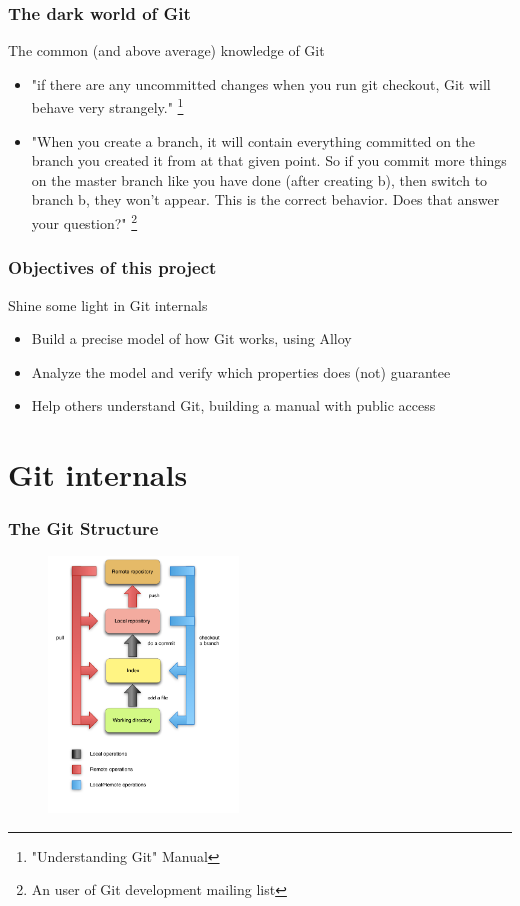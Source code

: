 \documentclass{beamer}
\begin{document}
\begin{frame}
	\frametitle{The dark world of Git}
	\begin{block}{The common (and above average) knowledge of Git }
	\begin{itemize}
	\item "if there are any uncommitted changes when you run git checkout,
	 Git will behave very strangely." \footnote{"Understanding Git" Manual}
	\item "When you create a branch, it will contain everything
         committed on the branch you created it from at that given
         point. So if you commit more things on the master branch like
         you have done (after creating b), then switch to branch b,
         they won't appear. This is the correct behavior. Does that
         answer your question?" \footnote{An user of Git development 
	 mailing list} 
	\end{itemize}
	\end{block}
\end{frame}

\begin{frame}
	\frametitle{Objectives of this project}
	\begin{block}{Shine some light in Git internals}
		\begin{itemize}
			\item Build a precise model of how Git works, using 
			Alloy
			\item Analyze the model and verify which properties
			does (not) guarantee
			\item Help others understand Git, building
			a manual with public access
		\end{itemize}
	\end{block}
\end{frame}


\section{Git internals}

\begin{frame}
   \frametitle{The Git Structure}
   \begin{figure}
      \centering
      \includegraphics[width=0.45\textwidth]{images/git_workflow.png}
   \end{figure}
\end{frame}
\end{document}
